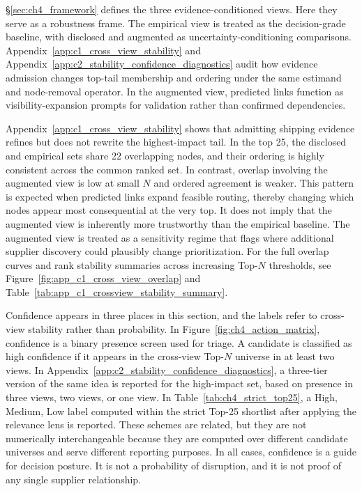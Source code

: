 \S\ref{sec:ch4_framework} defines the three evidence-conditioned views. Here they serve as a robustness frame. The empirical view is treated as the decision-grade baseline, with disclosed and augmented as uncertainty-conditioning comparisons. Appendix~\ref{app:c1_cross_view_stability} and Appendix~\ref{app:c2_stability_confidence_diagnostics} audit how evidence admission changes top-tail membership and ordering under the same estimand and node-removal operator. In the augmented view, predicted links function as visibility-expansion prompts for validation rather than confirmed dependencies.

Appendix~\ref{app:c1_cross_view_stability} shows that admitting shipping evidence refines but does not rewrite the highest-impact tail. In the top 25, the disclosed and empirical sets share 22 overlapping nodes, and their ordering is highly consistent across the common ranked set. In contrast, overlap involving the augmented view is low at small $N$ and ordered agreement is weaker. This pattern is expected when predicted links expand feasible routing, thereby changing which nodes appear most consequential at the very top. It does not imply that the augmented view is inherently more trustworthy than the empirical baseline. The augmented view is treated as a sensitivity regime that flags where additional supplier discovery could plausibly change prioritization. For the full overlap curves and rank stability summaries across increasing Top-$N$ thresholds, see Figure~\ref{fig:app_c1_cross_view_overlap} and Table~\ref{tab:app_c1_crossview_stability_summary}.

Confidence appears in three places in this section, and the labels refer to cross-view stability rather than probability. In Figure~\ref{fig:ch4_action_matrix}, confidence is a binary presence screen used for triage. A candidate is classified as high confidence if it appears in the cross-view Top-$N$ universe in at least two views. In Appendix~\ref{app:c2_stability_confidence_diagnostics}, a three-tier version of the same idea is reported for the high-impact set, based on presence in three views, two views, or one view. In Table~\ref{tab:ch4_strict_top25}, a High, Medium, Low label computed within the strict Top-25 shortlist after applying the relevance lens is reported. These schemes are related, but they are not numerically interchangeable because they are computed over different candidate universes and serve different reporting purposes. In all cases, confidence is a guide for decision posture. It is not a probability of disruption, and it is not proof of any single supplier relationship.

